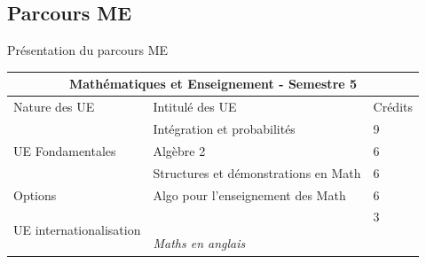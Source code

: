 \documentclass{beamer}
\begin{document}
\subsection{Parcours ME}


 \begin{frame}{Présentation du parcours   ME}
 \begin{tabular}{|l|l|l|}
  \hline
  \multicolumn{3}{|c|}{{\bf Mathématiques et Enseignement - Semestre 5}} \\
  \hline
    Nature des UE& Intitulé des UE & Crédits  \\
  \hline
  \multirow{3}{*}{UE Fondamentales} & {\color{mypink1}Intégration et probabilités} &9  \\
                                                            & {\color{mypink1}Algèbre 2}&6  \\
                                                            & Structures et démonstrations en Math&6  \\
     \hline
      \multirow{1}{*}{Options} & Algo pour l'enseignement des Math &6  \\
     \hline
 \multirow{4}{*}{UE internationalisation} &    &3  \\
                                                            & \hspace{2.5cm}{\it {\color{mypink1} Anglais}} &  \\
                                                            & \hspace{2.3cm} {\em {\color{mypink1} Maths en anglais}} &  \\
     \hline

\end{tabular}


 \end{frame}
\end{document}

